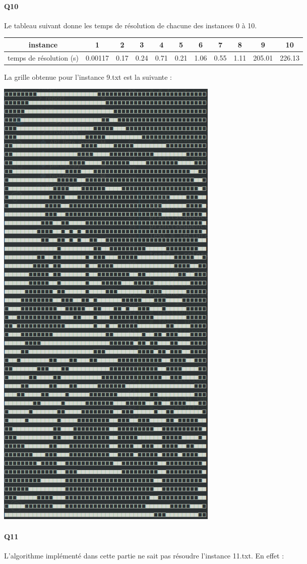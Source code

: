 \documentclass[12pt]{article}
\begin{document}
	\paragraph{Q10}
	
	Le tableau suivant donne les temps de résolution de chacune des instances 0 à 10.
	\begin{center}
		\begin{tabular}{|c|c|c|c|c|c|c|c|c|c|c| }
			\hline
			instance & 1 & 2 & 3 & 4 & 5 & 6 & 7 & 8 & 9 & 10 \\ \hline
			temps de résolution (s) & 0.00117 & 0.17 & 0.24 & 0.71 & 0.21 & 1.06 & 0.55 & 1.11 & 205.01 & 226.13 \\ \hline
		\end{tabular}
	\end{center}
	
	La grille obtenue pour l'instance 9.txt est la suivante :
	\begin{center}
		\includegraphics[scale=0.4]{instance9.png}
	\end{center}
	
	\paragraph{Q11}
	
	L'algorithme implémenté dans cette partie ne sait pas résoudre l'instance 11.txt. En effet : 
	
\end{document}
